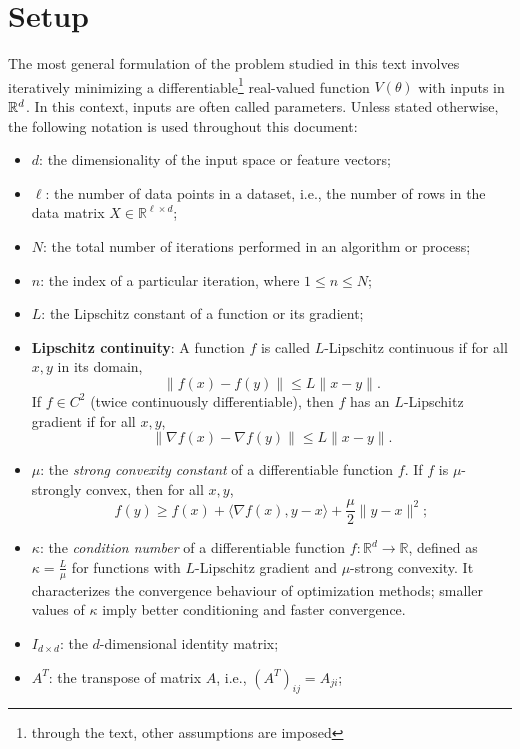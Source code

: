 \documentclass[12pt]{article}
\begin{document}
\section{Setup}
The most general formulation of the problem studied in this text involves iteratively minimizing a differentiable\footnote{through the text, other assumptions are imposed} real-valued function $V(\theta)$ with inputs in ${\mathbb{R}}^d$.
In this context, inputs are often called parameters.
Unless stated otherwise, the following notation is used throughout this document:

\begin{itemize}
    \item $d$: the dimensionality of the input space or feature vectors;
    \item $\ell$: the number of data points in a dataset, i.e., the number of rows in the data matrix $X \in \mathbb{R}^{\ell \times d}$;
    \item $N$: the total number of iterations performed in an algorithm or process;
    \item $n$: the index of a particular iteration, where $1 \le n \le N$;

    \item $L$: the Lipschitz constant of a function or its gradient;
    \item \textbf{Lipschitz continuity}: A function $f$ is called $L$-Lipschitz continuous if for all $x, y$ in its domain,
    \[
        \|f(x) - f(y)\| \le L \|x - y\|.
    \]
    If $f \in C^2$ (twice continuously differentiable), then $f$ has an $L$-Lipschitz gradient if for all $x, y$,
    \[
        \|\nabla f(x) - \nabla f(y)\| \le L \|x - y\|.
    \]

    \item $\mu$: the \textit{strong convexity constant} of a differentiable function $f$. If $f$ is $\mu$-strongly convex, then for all $x, y$,
    \[
        f(y) \ge f(x) + \langle \nabla f(x), y - x \rangle + \frac{\mu}{2} \|y - x\|^2;
    \]

    \item $\kappa$: the \textit{condition number} of a differentiable function $f : \mathbb{R}^d \to \mathbb{R}$, defined as $\kappa = \frac{L}{\mu}$ for functions with $L$-Lipschitz gradient and $\mu$-strong convexity. It characterizes the convergence behaviour of optimization methods; smaller values of $\kappa$ imply better conditioning and faster convergence.

    \item $I_{d \times d}$: the $d$-dimensional identity matrix;
    \item $A^T$: the transpose of matrix $A$, i.e., $(A^T)_{ij} = A_{ji}$;


\end{itemize}
\end{document}
